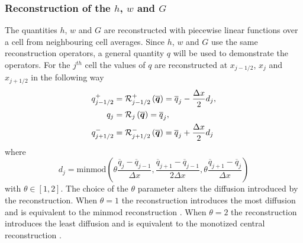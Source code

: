 \subsubsection{Reconstruction of the $h$, $w$ and $G$}
The quantities $h$, $w$ and $G$ are reconstructed with piecewise linear functions over a cell from neighbouring cell averages. Since $h$, $w$ and $G$ use the same reconstruction operators, a general quantity $q$ will be used to demonstrate the operators. For the $j^{th}$ cell the values of $q$ are reconstructed at $x_{j-1/2} $, $x_{j} $ and $x_{j+1/2}$ in the following way
\begin{subequations}
	\begin{align}
	q^+_{j-1/2} & = \mathcal{R}^+_{j-1/2} \left(\overline{\boldsymbol{q}}\right) = \overline{q}_j - \dfrac{\Delta x}{2} d_j, \\
	q_{j} &= \mathcal{R}_{j} \left(\overline{\boldsymbol{q}}\right) =\overline{q}_j ,\\
	q^-_{j+1/2} &= \mathcal{R}^-_{j+1/2} \left(\overline{\boldsymbol{q}}\right) = \overline{q}_j + \dfrac{\Delta x}{2} d_j
	\end{align}
	\label{eqn:ReconforhwG}
\end{subequations}
where 
\begin{equation}
d_j = \text{minmod}\left(\theta \dfrac{\overline{q}_j -\overline{q}_{j-1} }{\Delta x}, \dfrac{\overline{q}_{j+1} -\overline{q}_{j-1} }{2\Delta x}, \theta\dfrac{\overline{q}_{j+1} -\overline{q}_{j} }{\Delta x}\right)
\label{eqn:slopehGrecon}
\end{equation}
with $\theta \in \left[1,2\right]$. The choice of the $\theta$ parameter alters the diffusion introduced by the reconstruction. When $\theta =1$ the reconstruction introduces the most diffusion and is equivalent to the minmod reconstruction \cite{Roe-1986-337}. When $\theta = 2$ the reconstruction introduces the least diffusion and is equivalent to the monotized central reconstruction \cite{VanLeer-1977-276}.

